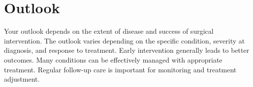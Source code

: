 \section{Outlook}
Your outlook depends on the extent of disease and success of surgical intervention. The outlook varies depending on the specific condition, severity at diagnosis, and response to treatment. Early intervention generally leads to better outcomes. Many conditions can be effectively managed with appropriate treatment. Regular follow-up care is important for monitoring and treatment adjustment.
